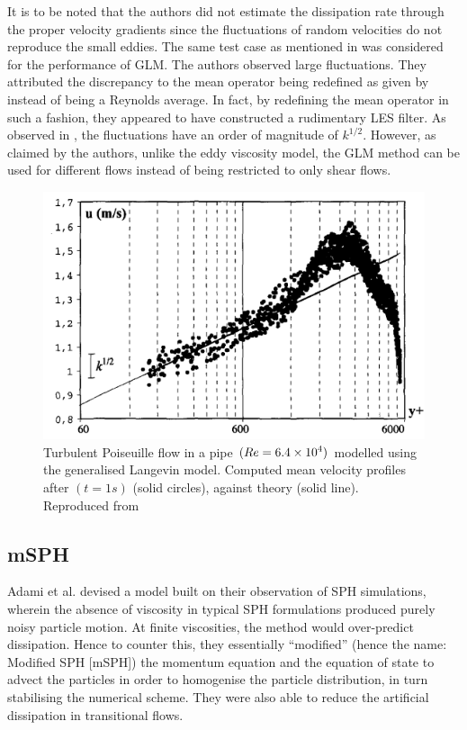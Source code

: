 It is to be noted that the authors did not estimate the dissipation rate through the proper velocity gradients since the fluctuations of random velocities do not reproduce the small eddies.
The same test case as mentioned in  was considered for the performance of GLM. 
The authors observed large fluctuations. They attributed the discrepancy to the mean operator being redefined as given by  instead of being a Reynolds average. In fact, by redefining the mean operator in such a fashion, they appeared to have constructed a rudimentary LES filter. 
As observed in , the fluctuations have an order of magnitude of $k^{1/2}$. However, as claimed by the authors, unlike the eddy viscosity model, the GLM method can be used for different flows instead of being restricted to only shear flows.
\begin{figure}[H]
    \centering
    \includegraphics{Figures/research_papers/violeau2002-GLM-result.png}
    \caption{Turbulent Poiseuille flow in a pipe $(Re = 6.4 \times {10}^{4})$ modelled using the generalised Langevin model. Computed mean velocity profiles after $(t=1s)$ (solid circles), against theory (solid line). Reproduced from \cite{VIOLEAU2002}}
    \label{fig:violeau2002-GLM-result}
\end{figure}


\subsection{mSPH}
Adami et al. \parencite{Adami2012} devised a model built on their observation of SPH simulations, wherein the absence of viscosity in typical SPH formulations produced purely noisy particle motion. At finite viscosities, the method would over-predict dissipation. Hence to counter this, they essentially ``modified'' (hence the name: Modified SPH [mSPH]) the momentum equation and the equation of state to advect the particles in order to homogenise the particle distribution, in turn stabilising the numerical scheme. They were also able to reduce the artificial dissipation in transitional flows.

